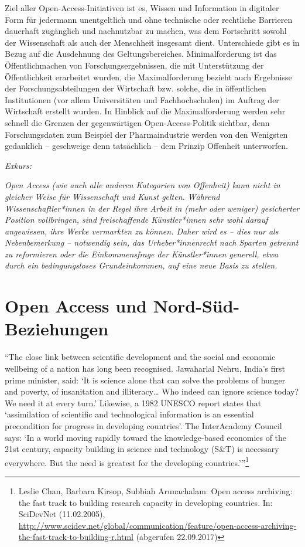 \documentclass[a4paper,
fontsize=11pt,
oneside,
numbers=noperiodatend,
parskip=half-,
bibliography=totoc,
final
]{scrartcl}
\begin{document}
Ziel aller Open-Access-Initiativen ist es, Wissen und Information in
digitaler Form für jedermann unentgeltlich und ohne technische oder
rechtliche Barrieren dauerhaft zugänglich und nachnutzbar zu machen, was
dem Fortschritt sowohl der Wissenschaft als auch der Menschheit
insgesamt dient. Unterschiede gibt es in Bezug auf die Ausdehnung des
Geltungsbereiches. Minimalforderung ist das Öffentlichmachen von
Forschungsergebnissen, die mit Unterstützung der Öffentlichkeit
erarbeitet wurden, die Maximalforderung bezieht auch Ergebnisse der
Forschungsabteilungen der Wirtschaft bzw. solche, die in öffentlichen
Institutionen (vor allem Universitäten und Fachhochschulen) im Auftrag
der Wirtschaft erstellt wurden. In Hinblick auf die Maximalforderung
werden sehr schnell die Grenzen der gegenwärtigen Open-Access-Politik
sichtbar, denn Forschungsdaten zum Beispiel der Pharmaindustrie werden
von den Wenigsten gedanklich -- geschweige denn tatsächlich -- dem
Prinzip Offenheit unterworfen.

\emph{Exkurs:}

\emph{Open Access (wie auch alle anderen Kategorien von Offenheit) kann
nicht in gleicher Weise für Wissenschaft und Kunst gelten. Während
Wissenschaftler*innen in der Regel ihre Arbeit in (mehr oder weniger)
gesicherter Position vollbringen, sind freischaffende Künstler*innen
sehr wohl darauf angewiesen, ihre Werke vermarkten zu können. Daher wird
es -- dies nur als Nebenbemerkung -- notwendig sein, das
Urheber*innenrecht nach Sparten getrennt zu reformieren oder die
Einkommensfrage der Künstler*innen generell, etwa durch ein
bedingungsloses Grundeinkommen, auf eine neue Basis zu stellen.}

\hypertarget{open-access-und-nord-suxfcd-beziehungen}{%
\section*{Open Access und
Nord-Süd-Beziehungen}\label{open-access-und-nord-suxfcd-beziehungen}}

\enquote{The close link between scientific development and the social
and economic wellbeing of a nation has long been recognised. Jawaharlal
Nehru, India's first prime minister, said: \enquote{It is science alone
that can solve the problems of hunger and poverty, of insanitation and
illiteracy\ldots{} Who indeed can ignore science today? We need it at
every turn.} Likewise, a 1982 UNESCO report states that
\enquote{assimilation of scientific and technological information is an
essential precondition for progress in developing countries}. The
InterAcademy Council says: \enquote{In a world moving rapidly toward the
knowledge-based economies of the 21st century, capacity building in
science and technology (S\&T) is necessary everywhere. But the need is
greatest for the developing countries.}}\footnote{Leslie Chan, Barbara
  Kirsop, Subbiah Arunachalam: Open access archiving: the fast track to
  building research capacity in developing countries. In: SciDevNet
  (11.02.2005),
  \url{http://www.scidev.net/global/communication/feature/open-access-archiving-the-fast-track-to-building-r.html}
  (abgerufen 22.09.2017)}
\end{document}
